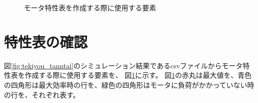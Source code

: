 \begin{figure}[t]
	\centering
	\caption{モータ特性表を作成する際に使用する要素}
	\label{fig:tekiyou_csv_wakariyasui}
\end{figure}

\clearpage

\section{特性表の確認}
図\ref{fig:tekiyou_tanntai}のシミュレーション結果であるcsvファイルからモータ特性表を作成する際に使用する要素を、
図\ref{fig:tekiyou_csv_wakariyasui}に示す。
図\ref{fig:tekiyou_csv_wakariyasui}の赤丸は最大値を、青色の四角形は最大効率時の行を、緑色の四角形はモータに負荷がかかっていない時の行を、それぞれ表す。

